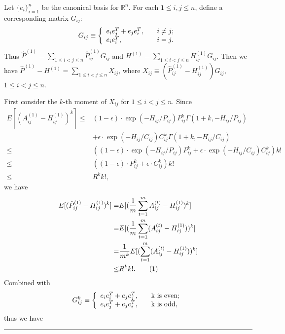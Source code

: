 \documentclass[a4paper]{article}
\newenvironment{proof}{{\bf Proof:  }}{\hfill\rule{2mm}{2mm}}
\begin{document}
\noindent
\begin{proof}
Let $\{e_i\}_{i=1}^n$ be the canonical basis for $\mathbb{R}^n$. For each $1 \le i, j \le n$, define a corresponding matrix $G_{ij}$:
\[
    G_{ij} \equiv \left\{
    \begin{array}{l l}
        e_i e_j^T + e_j e_i^T, \quad & i \ne j;\\
        e_i e_i^T, \quad & i = j.
    \end{array}
    \right.
\]
Thus $\hat{P}^{(1)} = \sum_{1 \le i < j \le n} \hat{P}^{(1)}_{ij} G_{ij}$ and $H^{(1)} = \sum_{1 \le i < j \le n} H^{(1)}_{ij} G_{ij}$. Then we have $\hat{P}^{(1)} - H^{(1)} = \sum_{1 \le i < j \le n} X_{ij}$, where $X_{ij} \equiv \left( \hat{P}^{(1)}_{ij} - H^{(1)}_{ij} \right) G_{ij}$, $1 \le i < j \le n$.

First consider the $k$-th moment of $X_{ij}$ for $1 \le i < j \le n$. 
Since
\begin{align*}
	E[(A^{(1)}_{ij} - H^{(1)}_{ij})^k]
    \le & (1-\epsilon) \cdot \exp(-H_{ij}/P_{ij}) P_{ij}^k \Gamma(1+k, -H_{ij}/P_{ij}) \\
    & + \epsilon \cdot \exp(-H_{ij}/C_{ij}) C_{ij}^k \Gamma(1+k, -H_{ij}/C_{ij}) \\
    \le & \left( (1-\epsilon) \cdot \exp(-H_{ij}/P_{ij}) P_{ij}^k + \epsilon \cdot \exp(-H_{ij}/C_{ij}) C_{ij}^k \right) k! \\
    \le & \left( (1-\epsilon) \cdot P_{ij}^k + \epsilon \cdot C_{ij}^k \right) k! \\
    \le & R^k k!,
\end{align*}
we have
\begin{align*}
	E[(\hat{P}^{(1)}_{ij} - H^{(1)}_{ij})^k]
    = & E[(\frac{1}{m}\sum_{t=1}^m A^{(t)}_{ij} - H^{(1)}_{ij})^k] \\
    = & E[(\frac{1}{m}\sum_{t=1}^m (A^{(t)}_{ij} - H^{(1)}_{ij}))^k] \\
    = & \frac{1}{m^k} E[(\sum_{t=1}^m (A^{(t)}_{ij} - H^{(1)}_{ij}))^k] \\
    \le & R^k k!.
    \stepcounter{equation}\tag{\theequation}\label{eqn:expectpdiffqpowerkL1}
\end{align*}
Combined with
\[
    G_{ij}^k \equiv \left\{
    \begin{array}{l l}
        e_i e_i^T + e_j e_j^T, \quad & $k$ \text{ is even};\\
        e_i e_j^T + e_j e_i^T, \quad & $k$ \text{ is odd},
    \end{array}
    \right.
\]
thus we have
\begin{enumerate}

\end{enumerate}
\end{proof}
\end{document}
